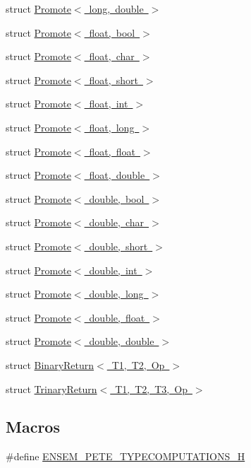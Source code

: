 \begin{DoxyCompactItemize}
struct \mbox{\hyperlink{structPromote_3_01long_00_01double_01_4}{Promote$<$ long, double $>$}}
\item 
struct \mbox{\hyperlink{structPromote_3_01float_00_01bool_01_4}{Promote$<$ float, bool $>$}}
\item 
struct \mbox{\hyperlink{structPromote_3_01float_00_01char_01_4}{Promote$<$ float, char $>$}}
\item 
struct \mbox{\hyperlink{structPromote_3_01float_00_01short_01_4}{Promote$<$ float, short $>$}}
\item 
struct \mbox{\hyperlink{structPromote_3_01float_00_01int_01_4}{Promote$<$ float, int $>$}}
\item 
struct \mbox{\hyperlink{structPromote_3_01float_00_01long_01_4}{Promote$<$ float, long $>$}}
\item 
struct \mbox{\hyperlink{structPromote_3_01float_00_01float_01_4}{Promote$<$ float, float $>$}}
\item 
struct \mbox{\hyperlink{structPromote_3_01float_00_01double_01_4}{Promote$<$ float, double $>$}}
\item 
struct \mbox{\hyperlink{structPromote_3_01double_00_01bool_01_4}{Promote$<$ double, bool $>$}}
\item 
struct \mbox{\hyperlink{structPromote_3_01double_00_01char_01_4}{Promote$<$ double, char $>$}}
\item 
struct \mbox{\hyperlink{structPromote_3_01double_00_01short_01_4}{Promote$<$ double, short $>$}}
\item 
struct \mbox{\hyperlink{structPromote_3_01double_00_01int_01_4}{Promote$<$ double, int $>$}}
\item 
struct \mbox{\hyperlink{structPromote_3_01double_00_01long_01_4}{Promote$<$ double, long $>$}}
\item 
struct \mbox{\hyperlink{structPromote_3_01double_00_01float_01_4}{Promote$<$ double, float $>$}}
\item 
struct \mbox{\hyperlink{structPromote_3_01double_00_01double_01_4}{Promote$<$ double, double $>$}}
\item 
struct \mbox{\hyperlink{structBinaryReturn}{Binary\+Return$<$ T1, T2, Op $>$}}
\item 
struct \mbox{\hyperlink{structTrinaryReturn}{Trinary\+Return$<$ T1, T2, T3, Op $>$}}
\end{DoxyCompactItemize}
\subsection*{Macros}
\begin{DoxyCompactItemize}
\item 
\#define \mbox{\hyperlink{adat-devel_2lib_2ensem_2ensem_8h_a81a9ba977688526701ccdc058fa31cfa}{E\+N\+S\+E\+M\+\_\+\+P\+E\+T\+E\+\_\+\+T\+Y\+P\+E\+C\+O\+M\+P\+U\+T\+A\+T\+I\+O\+N\+S\+\_\+H}}
\end{DoxyCompactItemize}


